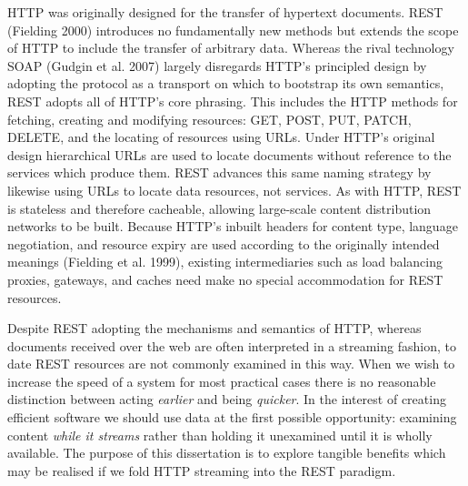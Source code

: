 \documentclass[12pt, ]{article}
\begin{document}
HTTP was originally designed for the transfer of hypertext documents.
REST (Fielding 2000) introduces no fundamentally new methods but extends
the scope of HTTP to include the transfer of arbitrary data. Whereas the
rival technology SOAP (Gudgin et al. 2007) largely disregards HTTP's
principled design by adopting the protocol as a transport on which to
bootstrap its own semantics, REST adopts all of HTTP's core phrasing.
This includes the HTTP methods for fetching, creating and modifying
resources: GET, POST, PUT, PATCH, DELETE, and the locating of resources
using URLs. Under HTTP's original design hierarchical URLs are used to
locate documents without reference to the services which produce them.
REST advances this same naming strategy by likewise using URLs to locate
data resources, not services. As with HTTP, REST is stateless and
therefore cacheable, allowing large-scale content distribution networks
to be built. Because HTTP's inbuilt headers for content type, language
negotiation, and resource expiry are used according to the originally
intended meanings (Fielding et al. 1999), existing intermediaries such
as load balancing proxies, gateways, and caches need make no special
accommodation for REST resources.

Despite REST adopting the mechanisms and semantics of HTTP, whereas
documents received over the web are often interpreted in a streaming
fashion, to date REST resources are not commonly examined in this way.
When we wish to increase the speed of a system for most practical cases
there is no reasonable distinction between acting \emph{earlier} and
being \emph{quicker}. In the interest of creating efficient software we
should use data at the first possible opportunity: examining content
\emph{while it streams} rather than holding it unexamined until it is
wholly available. The purpose of this dissertation is to explore
tangible benefits which may be realised if we fold HTTP streaming into
the REST paradigm.
\end{document}
